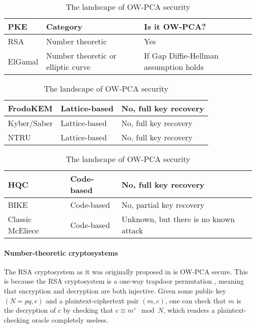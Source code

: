 \documentclass[runningheads]{llncs}
\begin{document}
\begin{table}[h]
    \centering
    \begin{tabular}{|p{9em}|p{10em}|p{14em}|}
        \hline
        \centering\textbf{PKE} & \textbf{Category} & \textbf{Is it OW-PCA?} \\
        \hline
        RSA & Number theoretic & Yes \cite{DBLP:conf/ima/Dent03,DBLP:journals/iacr/Shoup01} \\
        \hline
        ElGamal & {Number theoretic or \newline elliptic curve} & If Gap Diffie-Hellman assumption holds \cite{DBLP:conf/ctrsa/AbdallaBR01,DBLP:conf/pkc/OkamotoP01} \\
        \hline
    \end{tabular}\vspace{0.8em}
    \begin{tabular}{|p{9em}|p{10em}|p{14em}|}
        \hline
        FrodoKEM & Lattice-based & No, full key recovery \cite{DBLP:conf/crypto/GuoJN20,DBLP:conf/eurocrypt/BaetuDHTV19} \\
        \hline
        Kyber/Saber & Lattice-based & No, full key recovery \cite{DBLP:conf/acns/Huguenin-Dumittan20,DBLP:conf/asiacrypt/XagawaIUTH21,DBLP:conf/pqcrypto/GuoM23} \\
        \hline
        NTRU & Lattice-based & No, full key recovery \cite{hoffstein1999reaction,DBLP:conf/crypto/JaulmesJ00,DBLP:journals/tches/UenoXTITH22} \\
        \hline
    \end{tabular}\vspace{0.8em}
    \begin{tabular}{|p{9em}|p{10em}|p{14em}|}
        \hline
        HQC & Code-based & No, full key recovery \cite{DBLP:conf/acns/Huguenin-Dumittan20,DBLP:conf/eurocrypt/BaetuDHTV19} \\
        \hline
        BIKE & Code-based & No, partial key recovery \cite{DBLP:conf/asiacrypt/Guo0S16} \\
        \hline
        Classic McEliece & Code-based & Unknown, but there is no known attack \cite{DBLP:journals/tches/UenoXTITH22} \\
        \hline
    \end{tabular}\vspace{0.2em}
    \caption{The landscape of OW-PCA security}\label{tbl:ow-pca-candidates}
\end{table}


\paragraph{Number-theoretic cryptosystems} The RSA cryptosystem as it was originally proposed in \cite{DBLP:journals/cacm/RivestSA78} is OW-PCA secure. This is because the RSA cryptosystem is a one-way trapdoor permutation \cite{DBLP:conf/crypto/FujisakiOPS01}, meaning that encryption and decryption are both injective. Given some public key $(N=pq, e)$ and a plaintext-ciphertext pair $(m, c)$, one can check that $m$ is the decryption of $c$ by checking that $c \equiv m^e \mod N$, which renders a plaintext-checking oracle completely useless.
\end{document}
